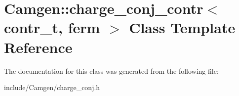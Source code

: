 \hypertarget{a00062}{}\section{Camgen\+:\+:charge\+\_\+conj\+\_\+contr$<$ contr\+\_\+t, ferm $>$ Class Template Reference}
\label{a00062}


The documentation for this class was generated from the following file\+:\begin{DoxyCompactItemize}
\item 
include/\+Camgen/charge\+\_\+conj.\+h\end{DoxyCompactItemize}
